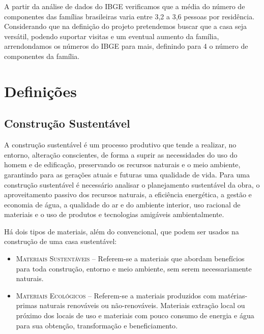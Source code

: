 	A partir da análise de dados do IBGE\cite{2010IBGE} verificamos que a média do número de componentes das famílias brasileiras varia entre 3,2 a 3,6 pessoas por residência. Considerando que na definição do projeto pretendemos buscar que a casa seja versátil, podendo suportar visitas e um eventual aumento da família, arrendondamos os números do IBGE\cite{2010IBGE} para mais, definindo para 4 o número de componentes da família. 

\newpage

\section{Definições}

\subsection{Construção Sustentável}
	
	A construção sustentável é um processo produtivo que tende a realizar, no entorno, alteração conscientes, de forma a suprir as necessidades do uso do homem e de edificação, preservando os recursos naturais e o meio ambiente, garantindo para as gerações atuais e futuras uma qualidade de vida\cite{1992Baroni}. Para uma construção sustentável é necessário analisar o planejamento sustentável da obra, o aproveitamento passivo dos recursos naturais, a eficiência energética, a gestão e economia de água, a qualidade do ar e do ambiente interior, uso racional de materiais e o uso de produtos e tecnologias amigáveis ambientalmente\cite{2012Araujo}.

Há dois tipos de materiais, além do convencional, que podem ser usados na construção de uma casa sustentável:

\begin{itemize}

	\item \textsc{Materiais Sustentáveis} -- Referem-se a materiais que abordam benefícios para toda construção, entorno e meio ambiente, sem serem necessariamente naturais. 

	\item \textsc{Materiais Ecológicos} -- Referem-se a materiais produzidos com matérias-primas naturais renováveis ou não-renováveis. Materiais extração local ou próximo dos locais de uso e materiais com pouco consumo de energia e água para sua obtenção, transformação e beneficiamento\cite{Angulo2000}.

\end{itemize}

